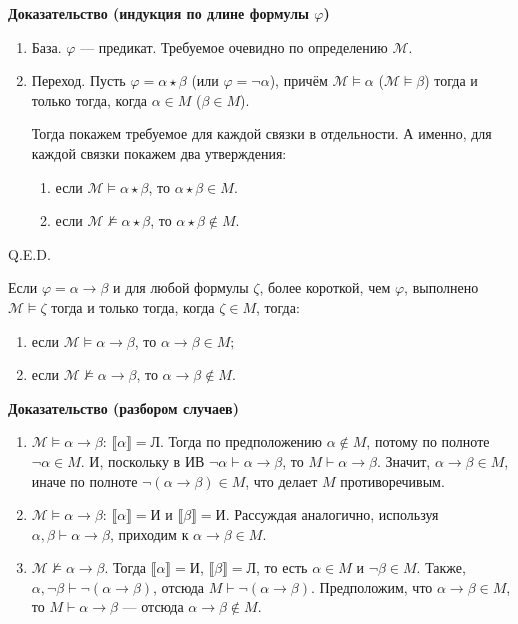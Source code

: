 \textbf{Доказательство (индукция по длине формулы $\varphi$)}
\begin{enumerate}
\item База. $\varphi$ --- предикат. Требуемое очевидно по определению $\mathcal{M}$.
\item Переход. Пусть $\varphi = \alpha\star\beta$ (или $\varphi=\neg\alpha$), причём $\mathcal{M}\models\alpha$ ($\mathcal{M}\models\beta$)
   тогда и только тогда, когда $\alpha\in M$ ($\beta\in M$).

Тогда покажем требуемое для каждой связки в отдельности. А именно, для каждой связки покажем два утверждения:
\begin{enumerate}
\item если $\mathcal{M}\models\alpha\star\beta$, то $\alpha\star\beta \in M$.
\item если $\mathcal{M}\not\models\alpha\star\beta$, то $\alpha\star\beta \notin M$.
\end{enumerate}
\end{enumerate}
\hfill Q.E.D.


Если $\varphi = \alpha\to\beta$ и для любой формулы $\zeta$, более короткой, чем $\varphi$, выполнено
$\mathcal{M}\models\zeta$ тогда и только тогда, когда $\zeta\in M$, тогда:
\begin{enumerate}
\item если $\mathcal{M}\models\alpha\to\beta$, то $\alpha\to\beta\in M$;
\item если $\mathcal{M}\not\models\alpha\to\beta$, то $\alpha\to\beta\notin M$.
\end{enumerate}

\textbf{Доказательство (разбором случаев)}
\begin{enumerate}
\item $\mathcal{M}\models\alpha\to\beta$: $\llbracket\alpha\rrbracket = \text{Л}$. 
Тогда по предположению $\alpha\notin M$, потому по полноте
$\neg\alpha\in M$. И, поскольку в ИВ $\neg\alpha\vdash\alpha\to\beta$, то $M \vdash \alpha\to\beta$. 
Значит, $\alpha\to\beta \in M$, иначе по полноте $\neg(\alpha\to\beta) \in M$, что делает $M$ противоречивым.
\item $\mathcal{M}\models\alpha\to\beta$: $\llbracket\alpha\rrbracket = \text{И}$ и $\llbracket\beta\rrbracket = \text{И}$. Рассуждая аналогично,
используя $\alpha,\beta\vdash\alpha\to\beta$, приходим к $\alpha\to\beta \in M$.
\item $\mathcal{M}\not\models\alpha\to\beta$. Тогда $\llbracket\alpha\rrbracket=\text{И}$,
$\llbracket\beta\rrbracket=\text{Л}$, то есть $\alpha\in M$ и $\neg\beta\in M$. 
Также, $\alpha,\neg\beta\vdash\neg(\alpha\to\beta)$, отсюда $M\vdash\neg(\alpha\to\beta)$. 
Предположим, что $\alpha\to\beta\in M$, то $M\vdash\alpha\to\beta$ --- отсюда
$\alpha\to\beta\notin M$.
\end{enumerate}



